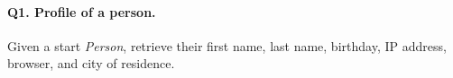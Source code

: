 \paragraph{\textbf{Q1}. Profile of a person.}
Given a start \emph{Person}, retrieve their first name, last name,
birthday, IP address, browser, and city of residence.
